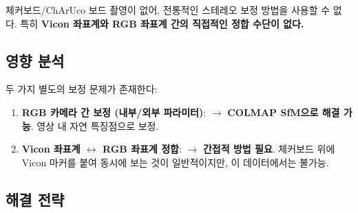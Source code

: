 \documentclass[11pt, a4paper]{report}
\begin{document}
\begin{constraintbox}[title={제한 2: 공간 보정 도구 부재}]
체커보드/ChArUco 보드 촬영이 없어, 전통적인 스테레오 보정 방법을 사용할 수 없다.
특히 \textbf{Vicon 좌표계와 RGB 좌표계 간의 직접적인 정합 수단이 없다.}
\end{constraintbox}

\subsection{영향 분석}

두 가지 별도의 보정 문제가 존재한다:

\begin{enumerate}[leftmargin=*]
  \item \textbf{RGB 카메라 간 보정 (내부/외부 파라미터)}:
        $\rightarrow$ \textbf{COLMAP SfM으로 해결 가능}. 영상 내 자연 특징점으로 보정.

  \item \textbf{Vicon 좌표계 $\leftrightarrow$ RGB 좌표계 정합}:
        $\rightarrow$ \textbf{간접적 방법 필요}. 체커보드 위에 Vicon 마커를 붙여 동시에 보는 것이 일반적이지만,
        이 데이터에서는 불가능.
\end{enumerate}

\subsection{해결 전략}
\end{document}
